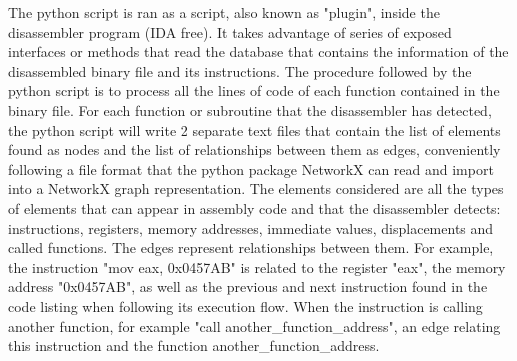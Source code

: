\begin{appendices}
The python script is ran as a script, also known as "plugin", inside the disassembler program (IDA free). It takes advantage of series of exposed interfaces or methods that read the database that contains the information of the disassembled binary file and its instructions. The procedure followed by the python script is to process all the lines of code of each function contained in the binary file. For each function or subroutine that the disassembler has detected, the python script will write 2 separate text files that contain the list of elements found as nodes and the list of relationships between them as edges, conveniently following a file format that the python package NetworkX can read and import into a NetworkX graph representation. 
The elements considered are all the types of elements that can appear in assembly code and that the disassembler detects: instructions, registers, memory addresses, immediate values, displacements and called functions. The edges represent relationships between them. For example, the instruction "mov eax, 0x0457AB" is related to the register "eax", the memory address "0x0457AB", as well as the previous and next instruction found in the code listing when following its execution flow. When the instruction is calling another function, for example "call another\_function\_address", an edge relating this instruction and the function another\_function\_address. 




\end{appendices}
